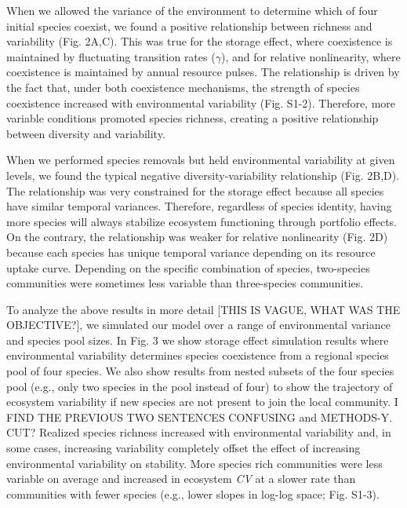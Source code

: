 \documentclass[12pt,]{article}
\begin{document}
When we allowed the variance of the environment to determine which of
four initial species coexist, we found a positive relationship between
richness and variability (Fig. 2A,C). This was true for the storage
effect, where coexistence is maintained by fluctuating transition rates
(\(\gamma\)), and for relative nonlinearity, where coexistence is
maintained by annual resource pulses. The relationship is driven by the
fact that, under both coexistence mechanisms, the strength of species
coexistence increased with environmental variability (Fig. S1-2).
Therefore, more variable conditions promoted species richness, creating
a positive relationship between diversity and variability.

When we performed species removals but held environmental variability at
given levels, we found the typical negative diversity-variability
relationship (Fig. 2B,D). The relationship was very constrained for the
storage effect because all species have similar temporal variances.
Therefore, regardless of species identity, having more species will
always stabilize ecosystem functioning through portfolio effects. On the
contrary, the relationship was weaker for relative nonlinearity (Fig.
2D) because each species has unique temporal variance depending on its
resource uptake curve. Depending on the specific combination of species,
two-species communities were sometimes less variable than three-species
communities.

To analyze the above results in more detail {[}THIS IS VAGUE, WHAT WAS
THE OBJECTIVE?{]}, we simulated our model over a range of environmental
variance and species pool sizes. In Fig. 3 we show storage effect
simulation results where environmental variability determines species
coexistence from a regional species pool of four species. We also show
results from nested subsets of the four species pool (e.g., only two
species in the pool instead of four) to show the trajectory of ecosystem
variability if new species are not present to join the local community.
I FIND THE PREVIOUS TWO SENTENCES CONFUSING and METHODS-Y. CUT? Realized
species richness increased with environmental variability and, in some
cases, increasing variability completely offset the effect of increasing
environmental variability on stability. More species rich communities
were less variable on average and increased in ecosystem \emph{CV} at a
slower rate than communities with fewer species (e.g., lower slopes in
log-log space; Fig. S1-3).
\end{document}
